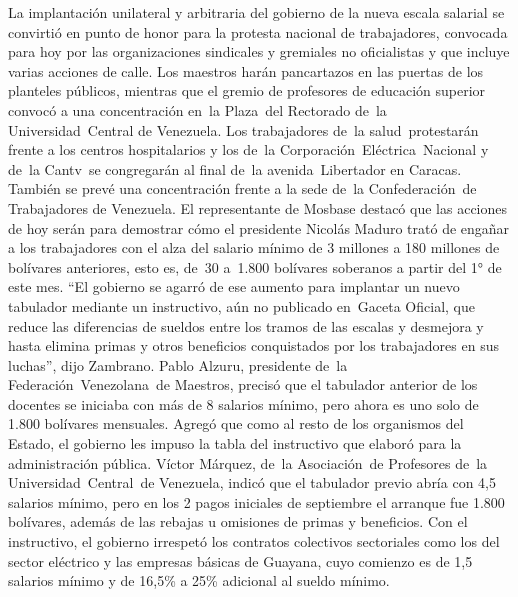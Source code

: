 \documentclass{article}%
\begin{document}
%
La implantación unilateral y arbitraria del gobierno de la nueva escala salarial se convirtió en punto de honor para la protesta nacional de trabajadores, convocada para hoy por las organizaciones sindicales y gremiales no oficialistas y que incluye varias acciones de calle. Los maestros harán pancartazos en las puertas de los planteles públicos, mientras que el gremio de profesores de educación superior convocó a una concentración en~la Plaza~del Rectorado de~la Universidad~Central de Venezuela.%
\newline%
%
Los trabajadores de~la salud~protestarán frente a los centros hospitalarios y los de~la Corporación~Eléctrica~Nacional y de~la Cantv~se congregarán al final de~la avenida~Libertador en Caracas. También se prevé una concentración frente a la sede de~la Confederación~de Trabajadores de Venezuela.%
\newline%
%
El representante de Mosbase destacó que las acciones de hoy serán para demostrar cómo el presidente Nicolás Maduro trató de engañar a los trabajadores con el alza del salario mínimo de 3 millones a 180 millones de bolívares anteriores, esto es, de~30 a~1.800 bolívares soberanos a partir del 1° de este mes.%
\newline%
%
“El gobierno se agarró de ese aumento para implantar un nuevo tabulador mediante un instructivo, aún no publicado en~Gaceta Oficial, que reduce las diferencias de sueldos entre los tramos de las escalas y desmejora y hasta elimina primas y otros beneficios conquistados por los trabajadores en sus luchas”, dijo Zambrano.%
\newline%
%
Pablo Alzuru, presidente de~la Federación~Venezolana~de Maestros, precisó que el tabulador anterior de los docentes se iniciaba con más de 8 salarios mínimo, pero ahora es uno solo de 1.800 bolívares mensuales. Agregó que como al resto de los organismos del Estado, el gobierno les impuso la tabla del instructivo que elaboró para la administración pública.%
\newline%
%
Víctor Márquez, de~la Asociación~de Profesores de~la Universidad~Central~de Venezuela, indicó que el tabulador previo abría con 4,5 salarios mínimo, pero en los 2 pagos iniciales de septiembre el arranque fue 1.800 bolívares, además de las rebajas u omisiones de primas y beneficios.%
\newline%
%
Con el instructivo, el gobierno irrespetó los contratos colectivos sectoriales como los del sector eléctrico y las empresas básicas de Guayana, cuyo comienzo es de 1,5 salarios mínimo y de 16,5\% a 25\% adicional al sueldo mínimo.%
\end{document}
